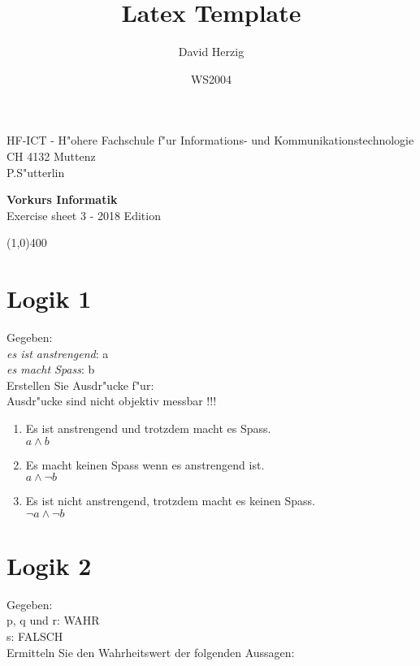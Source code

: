 \documentclass[a4paper,10pt]{article}
\title{Latex Template}
\author{David Herzig}
\date{WS2004}
\begin{document}
HF-ICT - H"ohere Fachschule f"ur Informations- und Kommunikationstechnologie\\
CH 4132 Muttenz\\
P.S"utterlin

\vspace{2mm}

\begin{center}
{\Large \bf Vorkurs Informatik}\\
Exercise sheet 3 - 2018 Edition
\end{center}

\vspace{2mm}

\line(1,0){400}

\vspace{5mm}

\section{Logik 1}
Gegeben:\\
\emph{es ist anstrengend}: a\\
\emph{es macht Spass}: b\\
Erstellen Sie Ausdr"ucke f"ur: \\
	 {\color{ForestGreen}
		 Ausdr"ucke sind nicht objektiv messbar !!!
	 }

\begin{enumerate}
\item Es ist anstrengend und trotzdem macht es Spass. \\
	 {\color{ForestGreen}
		 $a \land b$
	 }
\item Es macht keinen Spass wenn es anstrengend ist. \\
	 {\color{ForestGreen}
		 $a \land \lnot b$
	 }
\item Es ist nicht anstrengend, trotzdem macht es keinen Spass. \\
	 {\color{ForestGreen}
		 $\lnot a \land \lnot b$
	 }
\end{enumerate}

\section{Logik 2}
Gegeben:\\
p, q und r: WAHR\\
s: FALSCH\\
Ermitteln Sie den Wahrheitswert der folgenden Aussagen:
\end{document}
